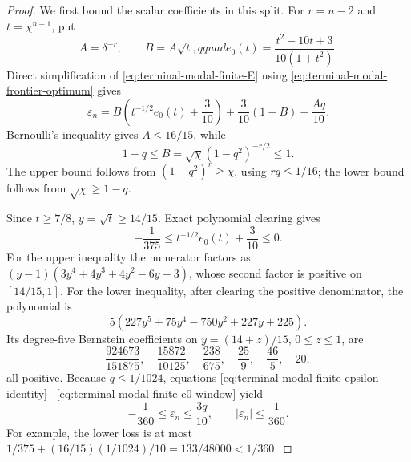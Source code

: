 \begin{proof}
We first bound the scalar coefficients in this split.  For $r=n-2$ and
$t=\chi^{n-1}$, put
\begin{equation}
 A=\delta^{-r},\qquad B=A\sqrt t,qquad
 e_0(t)=\frac{t^2-10t+3}{10(1+t^2)}.
\end{equation}
Direct simplification of \eqref{eq:terminal-modal-finite-E} using
\eqref{eq:terminal-modal-frontier-optimum} gives
\begin{equation}
 \varepsilon_n
 =B\left(t^{-1/2}e_0(t)+\frac3{10}\right)
 +\frac3{10}(1-B)-\frac{Aq}{10}.
 \label{eq:terminal-modal-finite-epsilon-identity}
\end{equation}
Bernoulli's inequality gives $A\le16/15$, while
\begin{equation}
 1-q\le B=\sqrt\chi(1-q^2)^{-r/2}\le1.
 \label{eq:terminal-modal-finite-AB-bounds}
\end{equation}
The upper bound follows from $(1-q^2)^r\ge\chi$, using $rq\le1/16$;
the lower bound follows from $\sqrt\chi\ge1-q$.

Since $t\ge7/8$, $y=\sqrt t\ge14/15$.  Exact polynomial clearing gives
\begin{equation}
 -\frac1{375}\le t^{-1/2}e_0(t)+\frac3{10}\le0.
 \label{eq:terminal-modal-finite-e0-window}
\end{equation}
For the upper inequality the numerator factors as
$(y-1)(3y^4+4y^3+4y^2-6y-3)$, whose second factor is positive on
$[14/15,1]$.  For the lower inequality, after clearing the positive
denominator, the polynomial is
\[5(227y^5+75y^4-750y^2+227y+225).
\]
Its degree-five Bernstein coefficients on
$y=(14+z)/15$, $0\le z\le1$, are
\[
 \frac{924673}{151875},\quad \frac{15872}{10125},\quad
 \frac{238}{675},\quad \frac{25}{9},\quad \frac{46}{5},\quad20,
\]
all positive.  Because $q\le1/1024$, equations
\eqref{eq:terminal-modal-finite-epsilon-identity}--
\eqref{eq:terminal-modal-finite-e0-window} yield
\begin{equation}
 -\frac1{360}\le\varepsilon_n\le\frac{3q}{10},\qquad
 |\varepsilon_n|\le\frac1{360}.
 \label{eq:terminal-modal-finite-epsilon-pointwise}
\end{equation}
For example, the lower loss is at most
$1/375+(16/15)(1/1024)/10=133/48000<1/360$.


\end{proof}
